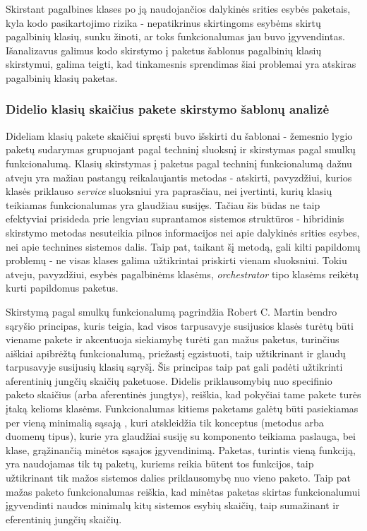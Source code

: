 Skirstant pagalbines klases po ją naudojančios dalykinės srities esybės paketais, kyla kodo pasikartojimo rizika - nepatikrinus skirtingoms esybėms skirtų pagalbinių
klasių, sunku žinoti, ar toks funkcionalumas jau buvo įgyvendintas.
Išanalizavus galimus kodo skirstymo į paketus šablonus pagalbinių klasių skirstymui, galima teigti, kad tinkamesnis sprendimas šiai
problemai yra atskiras pagalbinių klasių paketas.

\subsubsection{Didelio klasių skaičius pakete skirstymo šablonų analizė}
Dideliam klasių pakete skaičiui spręsti buvo išskirti du šablonai - žemesnio lygio paketų sudarymas grupuojant pagal techninį sluoksnį ir
skirstymas pagal smulkų funkcionalumą.
Klasių skirstymas į paketus pagal techninį funkcionalumą dažnu atveju yra mažiau pastangų reikalaujantis metodas - atskirti,
pavyzdžiui, kurios klasės priklauso \textit{service} sluoksniui yra paprasčiau, nei įvertinti, kurių klasių teikiamas funkcionalumas yra glaudžiau susijęs.
Tačiau šis būdas ne taip efektyviai prisideda prie lengviau suprantamos sistemos struktūros -
hibridinis skirstymo metodas nesuteikia pilnos informacijos nei apie dalykinės srities esybes, nei apie technines sistemos dalis.
Taip pat, taikant šį metodą, gali kilti papildomų problemų - ne visas klases galima užtikrintai priskirti vienam sluoksniui.
Tokiu atveju, pavyzdžiui, esybės pagalbinėms klasėms, \textit{orchestrator} tipo klasėms reikėtų kurti papildomus paketus.

Skirstymą pagal smulkų funkcionalumą pagrindžia Robert C. Martin bendro sąryšio principas, kuris teigia, kad visos tarpusavyje susijusios klasės turėtų būti viename pakete ir
akcentuoja siekiamybę turėti gan mažus paketus, turinčius aiškiai apibrėžtą funkcionalumą, priežastį egzistuoti, taip užtikrinant ir
glaudų tarpusavyje susijusių klasių sąryšį.
Šis principas taip pat gali padėti užtikrinti aferentinių jungčių skaičių paketuose.
Didelis priklausomybių nuo specifinio paketo skaičius (arba aferentinės jungtys), reiškia, kad pokyčiai tame pakete turės įtaką kelioms klasėms.
Funkcionalumas kitiems paketams galėtų būti pasiekiamas per vieną minimalią sąsają ,
kuri atskleidžia tik konceptus (metodus arba duomenų tipus), kurie yra glaudžiai susiję su komponento teikiama paslauga, bei
klase, grąžinančią minėtos sąsajos įgyvendinimą.
Paketas, turintis vieną funkciją, yra naudojamas tik tų paketų, kuriems reikia būtent tos funkcijos,
taip užtikrinant tik mažos sistemos dalies priklausomybę nuo vieno paketo.
Taip pat mažas paketo funkcionalumas reiškia, kad minėtas paketas skirtas funkcionalumui įgyvendinti naudos minimalų kitų sistemos esybių skaičių,
taip sumažinant ir eferentinių jungčių skaičių.


